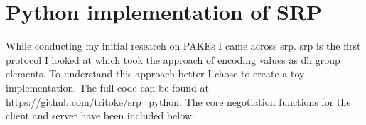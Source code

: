 \chapter{Python implementation of SRP}
\label{chap:appendix-srp}

While conducting my initial research on PAKEs I came across \gls{srp}\cite{srp}.
\gls{srp} is the first protocol I looked at which took the approach of encoding values as \gls{dh} group elements.
To understand this approach better I chose to create a toy implementation.
The full code can be found at \url{https://github.com/tritoke/srp_python}.
The core negotiation functions for the client and server have been included below:


